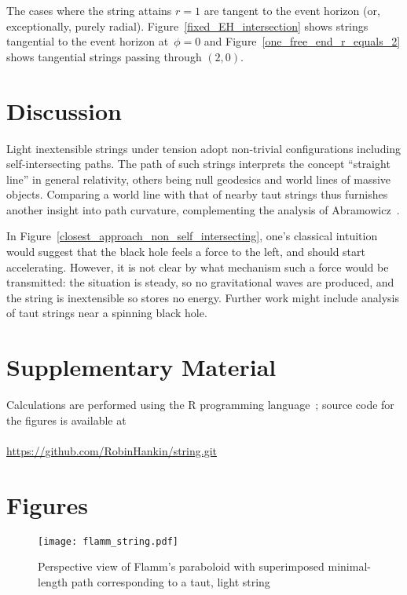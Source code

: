 \documentclass[prb,preprint]{revtex4-1}
\begin{document}
The cases where the string attains $r=1$ are tangent to the event
horizon (or, exceptionally, purely radial).
Figure~\ref{fixed_EH_intersection} shows strings tangential to the
event horizon at~$\phi=0$ and Figure~\ref{one_free_end_r_equals_2}
shows tangential strings passing through $(2,0)$.

\section{Discussion}

Light inextensible strings under tension adopt non-trivial
configurations including self-intersecting paths.  The path of such
strings interprets the concept ``straight line'' in general
relativity, others being null geodesics and world lines of massive
objects.  Comparing a world line with that of nearby taut strings thus
furnishes another insight into path curvature, complementing the
analysis of Abramowicz~\cite{abramowicz1992}.

In Figure~\ref{closest_approach_non_self_intersecting}, one's
classical intuition would suggest that the black hole feels a force to
the left, and should start accelerating.  However, it is not clear by
what mechanism such a force would be transmitted: the situation is
steady, so no gravitational waves are produced, and the string is
inextensible so stores no energy.  Further work might include analysis
of taut strings near a spinning black hole.




\section*{Supplementary Material}

Calculations are performed using the R programming language~\citep{rcore2018};
source code for the figures is available at
\\
\\
\url{https://github.com/RobinHankin/string.git}


\section*{Figures}

\begin{figure}[h!] %
\centering
\texttt{[image: flamm\_string.pdf]}
\caption{Perspective view of Flamm's paraboloid with superimposed minimal-length
  path corresponding to a taut, light string}
\label{flamm}
\end{figure}
\end{document}
